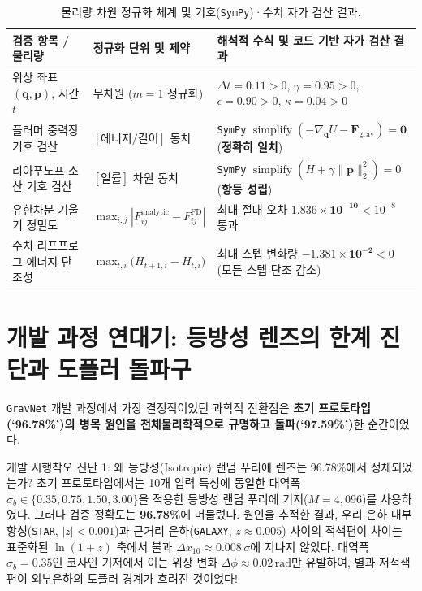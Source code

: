 \documentclass[11pt,a4paper]{article}
\begin{document}
\begin{table}[H]
\centering
\caption{물리량 차원 정규화 체계 및 기호(\texttt{SymPy})·수치 자가 검산 결과.}
\label{tab:verification}
\small
\begin{tabularx}{\textwidth}{l l >{\raggedright\arraybackslash}X}
\toprule
\textbf{검증 항목 / 물리량} & \textbf{정규화 단위 및 제약} & \textbf{해석적 수식 및 코드 기반 자가 검산 결과} \\
\midrule
위상 좌표 $(\mathbf{q}, \mathbf{p})$, 시간 $t$ & 무차원 ($m = 1$ 정규화) & $\Delta t = 0.11 > 0$, $\gamma = 0.95 > 0$, $\epsilon = 0.90 > 0$, $\kappa = 0.04 > 0$ \\
플러머 중력장 기호 검산 & $[\text{에너지}/\text{길이}]$ 동치 & \texttt{SymPy} $\operatorname{simplify}(-\nabla_{\mathbf{q}} U - \mathbf{F}_{\text{grav}}) = \mathbf{0}$ (\textbf{정확히 일치}) \\
리아푸노프 소산 기호 검산 & $[\text{일률}]$ 차원 동치 & \texttt{SymPy} $\operatorname{simplify}(\dot{H} + \gamma\|\mathbf{p}\|_2^2) = 0$ (\textbf{항등 성립}) \\
유한차분 기울기 정밀도 & $\max_{i,j}|F_{ij}^{\text{analytic}} - F_{ij}^{\text{FD}}|$ & 최대 절대 오차 $\mathbf{1.836 \times 10^{-10}} < 10^{-8}$ 통과 \\
수치 리프프로그 에너지 단조성 & $\max_{t,i}\big(H_{t+1,i} - H_{t,i}\big)$ & 최대 스텝 변화량 $\mathbf{-1.381 \times 10^{-2}} < 0$ (모든 스텝 단조 감소) \\
\bottomrule
\end{tabularx}
\end{table}

\section{\texorpdfstring{개발 과정 연대기: 등방성 렌즈의 한계 진단과 도플러 돌파구}{개발 과정 연대기: 등방성 렌즈의 한계 진단과 도플러 돌파구}}

\texttt{GravNet} 개발 과정에서 가장 결정적이었던 과학적 전환점은 \textbf{초기 프로토타입(`96.78\%')의 병목 원인을 천체물리학적으로 규명하고 돌파(`97.59\%')}한 순간이었다.

\begin{cautionbox}{개발 시행착오 진단 1: 왜 등방성(Isotropic) 랜덤 푸리에 렌즈는 96.78\%에서 정체되었는가?}
초기 프로토타입에서는 10개 입력 특성에 동일한 대역폭 $\sigma_b \in \{0.35, 0.75, 1.50, 3.00\}$을 적용한 등방성 랜덤 푸리에 기저($M=4,096$)를 사용하였다. 그러나 검증 정확도는 \textbf{96.78\%}에 머물렀다. 원인을 추적한 결과, 우리 은하 내부 항성(\texttt{STAR}, $|z| < 0.001$)과 근거리 은하(\texttt{GALAXY}, $z \approx 0.005$) 사이의 적색편이 차이는 표준화된 $\ln(1+z)$ 축에서 불과 $\Delta x_{10} \approx 0.008\,\sigma$에 지나지 않았다. 대역폭 $\sigma_b = 0.35$인 코사인 기저에서 이는 위상 변화 $\Delta\phi \approx 0.02\,\text{rad}$만 유발하여, 별과 저적색편이 외부은하의 도플러 경계가 흐려진 것이었다!
\end{cautionbox}
\end{document}
